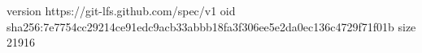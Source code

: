 version https://git-lfs.github.com/spec/v1
oid sha256:7e7754cc29214ce91edc9acb33abbb18fa3f306ee5e2da0ec136c4729f71f01b
size 21916
